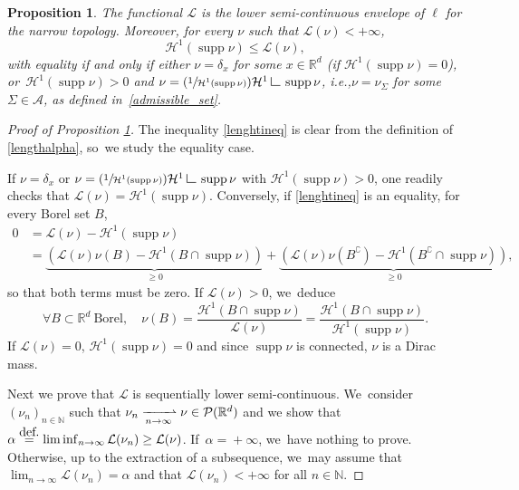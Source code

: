 \documentclass[11pt]{article}
\newcommand{\ie}{i.e.,\xspace}
\numberwithin{equation}{section}
\newcommand{\Psfrac}[2]{(\sfrac{#1}{#2})}
\newtheorem{proposition}[theorem]{Proposition}
\theoremstyle{definition}
\newcommand{\eqdef}{\ensuremath{\stackrel{\mbox{\upshape\tiny def.}}{=}}}
\newcommand\LM[1]{\hbox{\vrule width.5pt \vbox to#1pt{\vfill \hrule width#1pt height.5pt}}}
\newcommand\LL{{\mathchoice {\>\LM7\>}{\>\LM7\>}{\,\LM5\,}{\,\LM{3.35}\,}}}
\newcommand{\mres}{\LL}
\newcommand\cH{\mathcal{H}}
\newcommand{\RR}{\mathbb{R}}
\DeclareMathOperator{\supp}{supp}
\begin{document}
\begin{proposition}
\label{proposition.length_functional_is_lsc}
The functional $\mathcal{L}$ is the lower semi-continuous envelope of $\ell$ for the narrow topology. Moreover, for every $\nu$ such that $\mathcal{L}(\nu)<+\infty$,
\begin{equation}\label{lenghtineq}
\cH^1(\supp \nu)\leq \mathcal{L}(\nu),
\end{equation}
with equality if and only if either $\nu=\delta_x$ for some $x \in \RR^d$ (if $\cH^1(\supp\nu)=0$), or~$\cH^1(\supp\nu)>0$ and $ \nu=\Psfrac{1}{\cH^1(\supp \nu)}\cH^1\mres \supp \nu$, \ie $\nu = \nu_\Sigma$ for some $\Sigma \in \mathcal{A}$, as defined in~\eqref{admissible_set}.
\end{proposition}

\begin{proof}[Proof of Proposition \ref{proposition.length_functional_is_lsc}]
The inequality \eqref{lenghtineq} is clear from the definition of \eqref{lengthalpha}, so~we study the equality case.

If $\nu=\delta_x$ or $\nu=\Psfrac{1}{\cH^1(\supp \nu)}\cH^1\mres \supp \nu$ with $\cH^1(\supp\nu)>0$, one readily checks that $\mathcal{L}(\nu)=\cH^1(\supp \nu)$.
Conversely, if \eqref{lenghtineq} is an equality, for every Borel set $B$,
\begin{align*}
0 &= \mathcal{L}(\nu)-\cH^1(\supp\nu) \\
&= \underbrace{\left(\mathcal{L}(\nu)\nu(B)-\cH^1(B\cap \supp\nu)\right)}_{\geq 0}+ \underbrace{\left(\mathcal{L}(\nu)\nu(B^\complement)-\cH^1(B^\complement\cap \supp\nu)\right)}_{\geq 0},
\end{align*}
so that both terms must be zero. If $\mathcal{L}(\nu)>0$, we~deduce
\begin{equation*}
\forall B\subset \RR^d\ \mbox{Borel},\quad \nu(B) = \frac{\cH^1(B\cap \supp\nu)}{\mathcal{L}(\nu)}= \frac{\cH^1(B\cap \supp\nu)}{\cH^1(\supp \nu)}.
\end{equation*}
If $\mathcal{L}(\nu)=0$, $\cH^1(\supp\nu)=0$ and since $\supp \nu$ is connected, $\nu$ is a Dirac mass.

Next we prove that $\mathcal{L}$ is sequentially lower semi-continuous. We~consider $(\nu_{n})_{n\in \mathbb{N}}$ such that $\nu_n \xrightharpoonup[n \to \infty]{} \nu \in \mathcal{P}(\RR^d)$ and we show that $\alpha \eqdef \liminf_{n \to \infty} \mathcal{L}(\nu_n) \geq \mathcal{L}(\nu)$. If~$\alpha\!=\!+\infty$, we~have nothing to prove. Otherwise, up to the extraction of a subsequence, we~may assume that $\lim_{n \to \infty} \mathcal{L}(\nu_n)=\alpha$ and that $\mathcal{L}(\nu_n)<+\infty$ for all $n \in \mathbb{N}$.


\end{proof}
\end{document}
